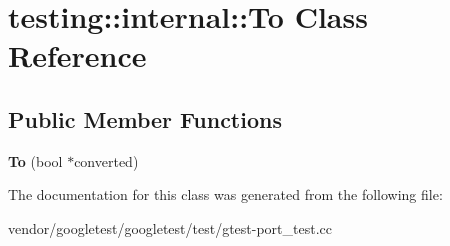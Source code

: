 \hypertarget{classtesting_1_1internal_1_1_to}{}\section{testing\+:\+:internal\+:\+:To Class Reference}
\label{classtesting_1_1internal_1_1_to}
\subsection*{Public Member Functions}
\begin{DoxyCompactItemize}
\item 
\mbox{\label{classtesting_1_1internal_1_1_to_a447354e55d855ed0f1a1de8b2b54d345}} 
{\bfseries To} (bool $\ast$converted)
\end{DoxyCompactItemize}


The documentation for this class was generated from the following file\+:\begin{DoxyCompactItemize}
\item 
vendor/googletest/googletest/test/gtest-\/port\+\_\+test.\+cc\end{DoxyCompactItemize}
